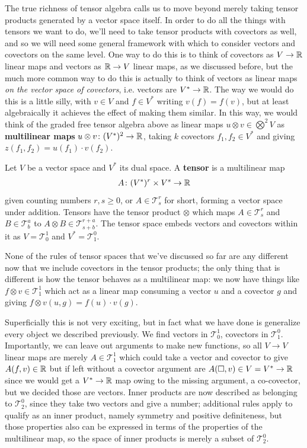 \documentclass[11pt]{article}
\begin{document}
The true richness of tensor algebra calls us to move beyond merely taking tensor products generated by a vector space itself. In order to do all the things with tensors we want to do, we'll need to take tensor products with covectors as well, and so we will need some general framework with which to consider vectors and covectors on the same level. One way to do this is to think of covectors as $V \to \mathbb{R}$ linear maps and vectors as $\mathbb{R} \to V$ linear maps, as we discussed before, but the much more common way to do this is actually to think of vectors as linear maps \emph{on the vector space of covectors}, i.e. vectors are $V^* \to \mathbb{R}$. The way we would do this is a little silly, with $v \in V$ and $f\in V^*$ writing $v(f) = f(v)$, but at least algebraically it achieves the effect of making them similar. In this way, we would think of the graded free tensor algebra above as linear maps $u \otimes v \in \bigotimes^2 V$ as \textbf{multilinear maps} $u \otimes v \colon (V^*)^2 \to \mathbb{R}$, taking $k$ covectors $f_1,f_2 \in V^*$ and giving $z(f_1, f_2) = u(f_1) \cdot v(f_2)$.

\begin{definition}
Let $V$ be a vector space and $V^*$ its dual space. A \textbf{tensor} is a multilinear map \begin{gather*}
A \colon (V^*)^r \times V^s \to \mathbb{R}
\end{gather*}
given counting numbers $r,s \ge 0$, or $A \in \mathcal T_s^r$ for short, forming a vector space under addition. Tensors have the tensor product $\otimes$ which maps $A \in \mathcal T_s^r$ and $B \in \mathcal T_b^a$ to $A \otimes B \in \mathcal T_{s + b}^{r + a}$. The tensor space embeds vectors and covectors within it as $V = \mathcal T^1_0$ and $V^* = \mathcal T_1^0$.
\end{definition}

None of the rules of tensor spaces that we've discussed so far are any different now that we include covectors in the tensor products; the only thing that is different is how the tensor behaves as a multilinear map: we now have things like $f \otimes v \in \mathcal T_1^1$ which act as a linear map consuming a vector $u$ and a covector $g$ and giving $f\otimes v(u,g) = f(u) \cdot v(g)$.

Superficially this is not very exciting, but in fact what we have done is generalize every object we described previously. We find vectors in $\mathcal T^1_0$, covectors in $\mathcal T_1^0$. Importantly, we can leave out arguments to make new functions, so all $V \to V$ linear maps are merely $A \in \mathcal T_1^1$ which could take a vector and covector to give $A(f,v)\in \mathbb{R}$ but if left without a covector argument are $A(\square, v) \in V = V^* \to \mathbb{R} $ since we would get a $V^* \to \mathbb{R}$ map owing to the missing argument, a co-covector, but we decided those are vectors. Inner products are now described as belonging to $\mathcal T_2^0$, since they take two vectors and give a number; additional rules apply to qualify as an inner product, namely symmetry and positive definiteness, but those properties also can be expressed in terms of the properties of the multilinear map, so the space of inner products is merely a subset of $\mathcal T_2^0$.
\end{document}
